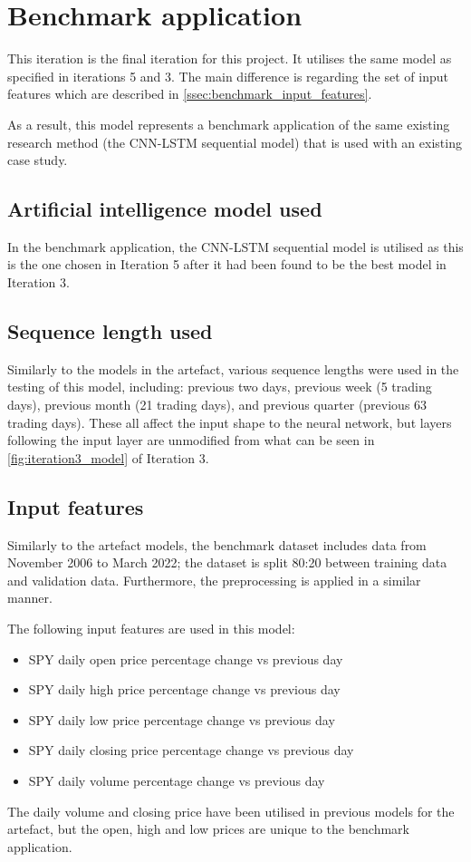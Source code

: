 \section{Benchmark application}
This iteration is the final iteration for this project. It utilises the same model as specified
in iterations 5 and 3. The main difference is regarding the set of input features which are described
in \autoref{ssec:benchmark_input_features}.

As a result, this model represents a benchmark application of the same existing research method
(the CNN-LSTM sequential model) that is used with an existing case study.

\subsection{Artificial intelligence model used}\label{ssec:benchmark_ai_model}
In the benchmark application, the CNN-LSTM sequential model is utilised as this is the one
chosen in Iteration 5 after it had been found to be the best model in Iteration 3.

\subsection{Sequence length used}
Similarly to the models in the artefact, various sequence lengths were used in the testing of this model,
including: previous two days, previous week (5 trading days), previous month (21 trading days), and previous quarter
(previous 63 trading days).
These all affect the input shape to the neural network, but layers following the input layer are unmodified from
what can be seen in \autoref{fig:iteration3_model} of Iteration 3.

\subsection{Input features}\label{ssec:benchmark_input_features}
Similarly to the artefact models, the benchmark dataset includes data from November 2006 to March 2022;
the dataset is split 80:20 between training data and validation data. Furthermore, the preprocessing is
applied in a similar manner.

The following input features are used in this model:

\begin{itemize}
    \item SPY daily open price percentage change vs previous day
    \item SPY daily high price percentage change vs previous day
    \item SPY daily low price percentage change vs previous day
    \item SPY daily closing price percentage change vs previous day
    \item SPY daily volume percentage change vs previous day
\end{itemize}

The daily volume and closing price have been utilised in previous models for the artefact,
but the open, high and low prices are unique to the benchmark application.